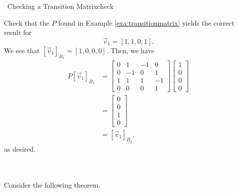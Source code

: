        \begin{example}{\Difficulty\,\Difficulty\,\,Checking a Transition Matrix}{check}

            Check that the \(P\) found in Example \ref{exa:transitionmatrix} yields the correct result for 
            \begin{equation*}
                \vec{v}_1=[1,1,0,1].
            \end{equation*}
            We see that \([\vec{v}_1]_{B_1}=[1,0,0,0]\). Then, we have
            \begin{align*}
                P[\vec{v}_1]_{B_1}&=\begin{bmatrix}
                    0 & 1 & -1 & 0 \\
                    0 & -1 & 0 & 1 \\
                    1 & 1 & 1 & -1 \\
                    0 & 0 & 0 & 1
                \end{bmatrix}\begin{bmatrix}
                    1 \\ 0 \\ 0 \\ 0
                \end{bmatrix} \\
                &=\begin{bmatrix}
                    0 \\ 0 \\ 1 \\ 0
                \end{bmatrix} \\
                &=[\vec{v}_1]_{B_2},
            \end{align*}
            as desired.
            
        \end{example}
        \vphantom
        \\
        \\
        Consider the following theorem.
